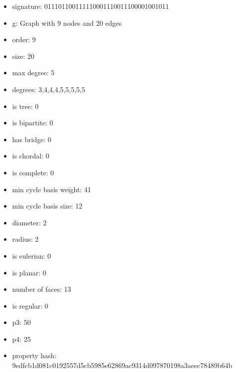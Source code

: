 \newpage
\begin{figure}
\end{figure}
\begin{itemize}
\item signature: 011101100111110001110011100001001011
\item g: Graph with 9 nodes and 20 edges
\item order: 9
\item size: 20
\item max degree: 5
\item degrees: 3,4,4,4,5,5,5,5,5
\item is tree: 0
\item is bipartite: 0
\item has bridge: 0
\item is chordal: 0
\item is complete: 0
\item min cycle basis weight: 41
\item min cycle basis size: 12
\item diameter: 2
\item radius: 2
\item is eulerian: 0
\item is planar: 0
\item number of faces: 13
\item is regular: 0
\item p3: 50
\item p4: 25
\item property hash: 9edfcb1d081c0192557d5cb5985e62869ac9314d097870198a3aeec78489b64b
\end{itemize}
